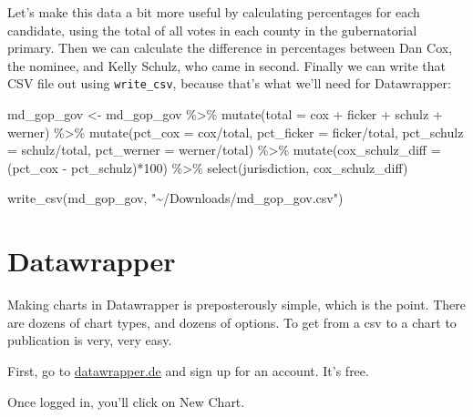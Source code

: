 \documentclass[
  letterpaper,
  DIV=11,
  numbers=noendperiod]{scrreprt}
\newenvironment{Shaded}{\begin{snugshade}}{\end{snugshade}}
\newcommand{\AttributeTok}[1]{\textcolor[rgb]{0.40,0.45,0.13}{#1}}
\newcommand{\DecValTok}[1]{\textcolor[rgb]{0.68,0.00,0.00}{#1}}
\newcommand{\FunctionTok}[1]{\textcolor[rgb]{0.28,0.35,0.67}{#1}}
\newcommand{\NormalTok}[1]{\textcolor[rgb]{0.00,0.23,0.31}{#1}}
\newcommand{\OtherTok}[1]{\textcolor[rgb]{0.00,0.23,0.31}{#1}}
\newcommand{\SpecialCharTok}[1]{\textcolor[rgb]{0.37,0.37,0.37}{#1}}
\newcommand{\StringTok}[1]{\textcolor[rgb]{0.13,0.47,0.30}{#1}}
\begin{document}
Let's make this data a bit more useful by calculating percentages for
each candidate, using the total of all votes in each county in the
gubernatorial primary. Then we can calculate the difference in
percentages between Dan Cox, the nominee, and Kelly Schulz, who came in
second. Finally we can write that CSV file out using
\texttt{write\_csv}, because that's what we'll need for Datawrapper:

\begin{Shaded}
\begin{Highlighting}[]
\NormalTok{md\_gop\_gov }\OtherTok{\textless{}{-}}\NormalTok{ md\_gop\_gov }\SpecialCharTok{\%\textgreater{}\%}
  \FunctionTok{mutate}\NormalTok{(}\AttributeTok{total =}\NormalTok{ cox }\SpecialCharTok{+}\NormalTok{ ficker }\SpecialCharTok{+}\NormalTok{ schulz }\SpecialCharTok{+}\NormalTok{ werner) }\SpecialCharTok{\%\textgreater{}\%}
  \FunctionTok{mutate}\NormalTok{(}\AttributeTok{pct\_cox =}\NormalTok{ cox}\SpecialCharTok{/}\NormalTok{total, }\AttributeTok{pct\_ficker =}\NormalTok{ ficker}\SpecialCharTok{/}\NormalTok{total, }\AttributeTok{pct\_schulz =}\NormalTok{ schulz}\SpecialCharTok{/}\NormalTok{total, }\AttributeTok{pct\_werner =}\NormalTok{ werner}\SpecialCharTok{/}\NormalTok{total) }\SpecialCharTok{\%\textgreater{}\%}
  \FunctionTok{mutate}\NormalTok{(}\AttributeTok{cox\_schulz\_diff =}\NormalTok{ (pct\_cox }\SpecialCharTok{{-}}\NormalTok{ pct\_schulz)}\SpecialCharTok{*}\DecValTok{100}\NormalTok{) }\SpecialCharTok{\%\textgreater{}\%}
  \FunctionTok{select}\NormalTok{(jurisdiction, cox\_schulz\_diff)}

\FunctionTok{write\_csv}\NormalTok{(md\_gop\_gov, }\StringTok{"\textasciitilde{}/Downloads/md\_gop\_gov.csv"}\NormalTok{)}
\end{Highlighting}
\end{Shaded}

\hypertarget{datawrapper}{%
\section{Datawrapper}\label{datawrapper}}

Making charts in Datawrapper is preposterously simple, which is the
point. There are dozens of chart types, and dozens of options. To get
from a csv to a chart to publication is very, very easy.

First, go to \href{https://www.datawrapper.de/}{datawrapper.de} and sign
up for an account. It's free.

Once logged in, you'll click on New Chart.
\end{document}
